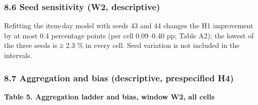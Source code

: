 \documentclass[
]{article}
\begin{document}
\subsubsection{8.6 Seed sensitivity (W2,
descriptive)}\label{seed-sensitivity-w2-descriptive}

Refitting the item-day model with seeds 43 and 44 changes the H1
improvement by at most 0.4 percentage points (per cell 0.09--0.40 pp;
Table A2); the lowest of the three seeds is ≥ 2.3 \% in every cell. Seed
variation is not included in the intervals.

\subsubsection{8.7 Aggregation and bias (descriptive, prespecified
H4)}\label{aggregation-and-bias-descriptive-prespecified-h4}

\textbf{Table 5. Aggregation ladder and bias, window W2, all cells}
\end{document}
